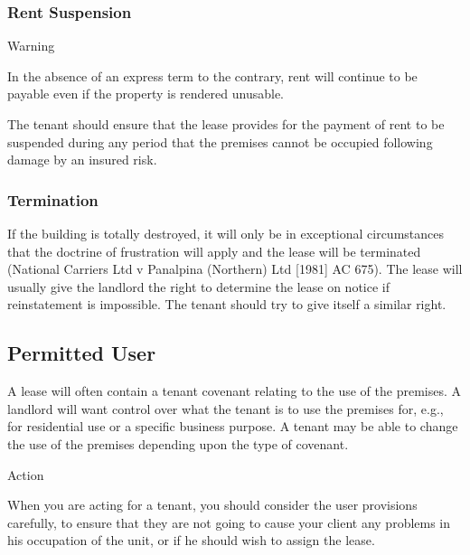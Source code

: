 \documentclass[
]{article}
\newenvironment{env-da05fb3b-c564-4905-b729-fa3c9eadbf7c}
{
    \savenotes\tcolorbox[blanker,breakable,left=5pt,borderline west={2pt}{-4pt}{aquamarine}]
}
{
    \endtcolorbox\spewnotes
}
\newenvironment{env-1183acc6-7dc8-44d4-a985-6dec306e67fd}
{
    \savenotes\tcolorbox[blanker,breakable,left=5pt,borderline west={2pt}{-4pt}{orange}]
}
{
    \endtcolorbox\spewnotes
}
\begin{document}
\hypertarget{rent-suspension}{%
\subsubsection{Rent Suspension}\label{rent-suspension}}

\begin{env-1183acc6-7dc8-44d4-a985-6dec306e67fd}

Warning

In the absence of an express term to the contrary, rent will continue to
be payable even if the property is rendered unusable.

\end{env-1183acc6-7dc8-44d4-a985-6dec306e67fd}

The tenant should ensure that the lease provides for the payment of rent
to be suspended during any period that the premises cannot be occupied
following damage by an insured risk.

\hypertarget{termination}{%
\subsubsection{Termination}\label{termination}}

If the building is totally destroyed, it will only be in exceptional
circumstances that the doctrine of frustration will apply and the lease
will be terminated (National Carriers Ltd v Panalpina (Northern) Ltd
{[}1981{]} AC 675). The lease will usually give the landlord the right
to determine the lease on notice if reinstatement is impossible. The
tenant should try to give itself a similar right.

\hypertarget{permitted-user}{%
\subsection{Permitted User}\label{permitted-user}}

A lease will often contain a tenant covenant relating to the use of the
premises. A landlord will want control over what the tenant is to use
the premises for, e.g., for residential use or a specific business
purpose. A tenant may be able to change the use of the premises
depending upon the type of covenant.

\begin{env-da05fb3b-c564-4905-b729-fa3c9eadbf7c}

Action

When you are acting for a tenant, you should consider the user
provisions carefully, to ensure that they are not going to cause your
client any problems in his occupation of the unit, or if he should wish
to assign the lease.

\end{env-da05fb3b-c564-4905-b729-fa3c9eadbf7c}
\end{document}

